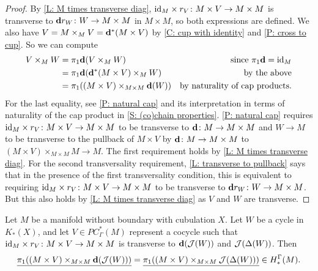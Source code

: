 \begin{proof}
	By \cref{L: M times transverse diag}, $\mathrm{id}_M \times r_V \colon M \times V \to M \times M$ is transverse to $\mathbf{d} r_W \colon W \to M \times M$ in $M \times M$, so both expressions are defined.
	We also have $V = M \times_M V = \mathbf{d}^*(M \times V)$ by \cref{C: cup with identity} and \cref{P: cross to cup}.
	So we can compute
	\begin{align*}
		V \times_M W& = \pi_1\mathbf{d} (V \times_M W)&\text{since $\pi_1\mathbf{d} = \mathrm{id}_M$}\\
		& = \pi_1\mathbf{d} (\mathbf{d}^*(M \times V) \times_M W)&\text{by the above}\\
		& = \pi_1((M \times V)\times_{M \times M}\mathbf{d}(W))&\text{by naturality of cap products.}
	\end{align*}
	For the last equality, see \cref{P: natural cap} and its interpretation in terms of naturality of the cap product in \cref{S: (co)chain properties}.
	\cref{P: natural cap} requires $\mathrm{id}_M \times r_V \colon M \times V \to M \times M$ to be transverse to $\mathbf{d} \colon M \to M \times M$ and $W \to M$ to be transverse to the pullback of $M \times V$ by $\mathbf{d} \colon M \to M \times M$ to
	$(M \times V)\times_{M \times M}M \to M$.
	The first requirement holds by \cref{L: M times transverse diag}.
	For the second transversality requirement, \cref{L: transverse to pullback} says that in the presence of the first transversality condition, this is equivalent to requiring $\mathrm{id}_M \times r_V \colon M \times V \to M \times M$ to be transverse to $\mathbf{d} r_W \colon W \to M \times M$.
	But this also holds by \cref{L: M times transverse diag} as $V$ and $W$ are transverse.
\end{proof}

\begin{lemma}\label{L: diagonal equivalence}
	Let $M$ be a manifold without boundary with cubulation $X$.
	Let $W$ be a cycle in $K_*(X)$, and let $V \in PC^*_\Gamma(M)$ represent a cocycle such that $\mathrm{id}_M \times r_V \colon M \times V \to M \times M$ is transverse to $\mathbf{d}(\mathcal{J}(W))$ and $\mathcal{J}(\Delta(W))$.
	Then $$\underline{\pi_1((M \times V) \times_{M \times M}\mathbf{d}(\mathcal{J}(W)))} = \underline{\pi_1( (M \times V)\times_{M \times M}\mathcal{J}(\Delta(W)))} \in H_*^\Gamma(M).$$
\end{lemma}

